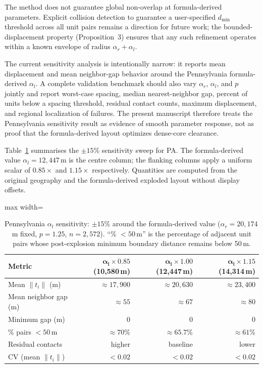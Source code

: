 \documentclass[12pt, a4paper]{article}
\numberwithin{equation}{section}
\begin{document}
\medskip
\noindent The method does not guarantee global non-overlap at formula-derived parameters. Explicit collision detection to guarantee a user-specified $d_{\min}$ threshold across all unit pairs remains a direction for future work; the bounded-displacement property (Proposition~3) ensures that any such refinement operates within a known envelope of radius $\alpha_r + \alpha_l$.

\medskip
\noindent The current sensitivity analysis is intentionally narrow: it reports mean displacement and mean neighbor-gap behavior around the Pennsylvania formula-derived $\alpha_l$. A complete validation benchmark should also vary $\alpha_r$, $\alpha_l$, and $p$ jointly and report worst-case spacing, median nearest-neighbor gap, percent of units below a spacing threshold, residual contact counts, maximum displacement, and regional localization of failures. The present manuscript therefore treats the Pennsylvania sensitivity result as evidence of smooth parameter response, not as proof that the formula-derived layout optimizes dense-core clearance.

\medskip
Table~\ref{tab:pa_sensitivity} summarises the $\pm 15\%$ sensitivity sweep for PA.
The formula-derived value $\alpha_l = 12{,}447$\,m is the centre column; the flanking
columns apply a uniform scalar of $0.85\times$ and $1.15\times$ respectively.
Quantities are computed from the original geography and the formula-derived exploded
layout without display offsets.

\begin{table}[H]
\centering
\caption{Pennsylvania $\alpha_l$ sensitivity: $\pm 15\%$ around the formula-derived
value ($\alpha_r = 20{,}174$\,m fixed, $p = 1.25$, $n = 2{,}572$).
``\% $<50$\,m'' is the percentage of adjacent unit pairs whose post-explosion
minimum boundary distance remains below 50\,m.}
\label{tab:pa_sensitivity}
\begin{adjustbox}{max width=\textwidth}
\begin{tabular}{lrrr}
\toprule
\textbf{Metric} & $\bm{\alpha_l \times 0.85}$ \textbf{(10,580\,m)} &
                  $\bm{\alpha_l \times 1.00}$ \textbf{(12,447\,m)} &
                  $\bm{\alpha_l \times 1.15}$ \textbf{(14,314\,m)} \\
\midrule
Mean $\|t_i\|$ (m)      & $\approx 17{,}900$ & $\approx 20{,}630$ & $\approx 23{,}400$ \\
Mean neighbor gap (m)   & $\approx 55$       & $\approx 67$       & $\approx 80$       \\
Minimum gap (m)         & 0                  & 0                  & 0                  \\
\% pairs $<50$\,m       & $\approx 70\%$     & $\approx 65.7\%$   & $\approx 61\%$     \\
Residual contacts       & higher             & baseline           & lower              \\
CV (mean $\|t_i\|$)     & $< 0.02$           & $< 0.02$           & $< 0.02$           \\
\bottomrule
\end{tabular}
\end{adjustbox}
\end{table}
\end{document}
